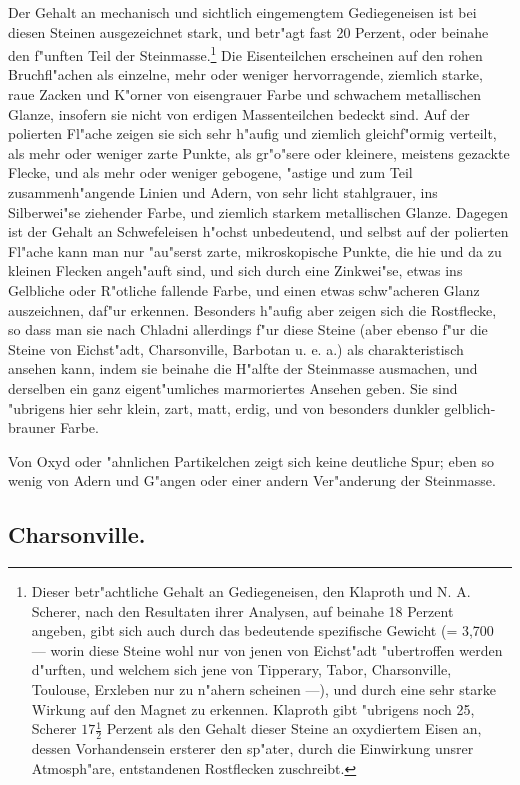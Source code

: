 \documentclass[a4paper, 11pt, oneside, german]{article}
\begin{document}
Der Gehalt an mechanisch und sichtlich eingemengtem Gediegeneisen ist bei diesen Steinen ausgezeichnet stark, und betr"agt fast 20 Perzent, oder beinahe den f"unften Teil der Steinmasse.\footnote{Dieser betr"achtliche Gehalt an Gediegeneisen, den Klaproth und N. A. Scherer, nach den Resultaten ihrer Analysen, auf beinahe 18 Perzent angeben, gibt sich auch durch das bedeutende spezifische Gewicht (= 3,700 --- worin diese Steine wohl nur von jenen von Eichst"adt "ubertroffen werden d"urften, und welchem sich jene von Tipperary, Tabor, Charsonville, Toulouse, Erxleben nur zu n"ahern scheinen ---), und durch eine sehr starke Wirkung auf den Magnet zu erkennen. Klaproth gibt "ubrigens noch 25, Scherer $17\frac{1}{2}$ Perzent als den Gehalt dieser Steine an oxydiertem Eisen an, dessen Vorhandensein ersterer den sp"ater, durch die Einwirkung unsrer Atmosph"are, entstandenen Rostflecken zuschreibt.} Die Eisenteilchen erscheinen auf den rohen Bruchfl"achen als einzelne, mehr oder weniger hervorragende, ziemlich starke, raue Zacken und K"orner von eisengrauer Farbe und schwachem metallischen Glanze, insofern sie nicht von erdigen Massenteilchen bedeckt sind. Auf der polierten Fl"ache zeigen sie sich sehr h"aufig und ziemlich gleichf"ormig verteilt, als mehr oder weniger zarte Punkte, als gr"o"sere oder kleinere, meistens gezackte Flecke, und als mehr oder weniger gebogene, "astige und zum Teil zusammenh"angende Linien und Adern, von sehr licht stahlgrauer, ins Silberwei"se ziehender Farbe, und ziemlich starkem metallischen Glanze. Dagegen ist der Gehalt an Schwefeleisen h"ochst unbedeutend, und selbst auf der polierten Fl"ache kann man nur "au"serst zarte, mikroskopische Punkte, die hie und da zu kleinen Flecken angeh"auft sind, und sich durch eine Zinkwei"se, etwas ins Gelbliche oder R"otliche fallende Farbe, und einen etwas schw"acheren Glanz auszeichnen, daf"ur erkennen. Besonders h"aufig aber zeigen sich die Rostflecke, so dass man sie nach Chladni allerdings f"ur diese Steine (aber ebenso f"ur die Steine von Eichst"adt, Charsonville, Barbotan u. e. a.) als charakteristisch ansehen kann, indem sie beinahe die H"alfte der Steinmasse ausmachen, und derselben ein ganz eigent"umliches marmoriertes Ansehen geben. Sie sind "ubrigens hier sehr klein, zart, matt, erdig, und von besonders dunkler gelblich-brauner Farbe.

Von Oxyd oder "ahnlichen Partikelchen zeigt sich keine deutliche Spur; eben so wenig von Adern und G"angen oder einer andern Ver"anderung der Steinmasse.

\subsection{Charsonville.}
\end{document}
